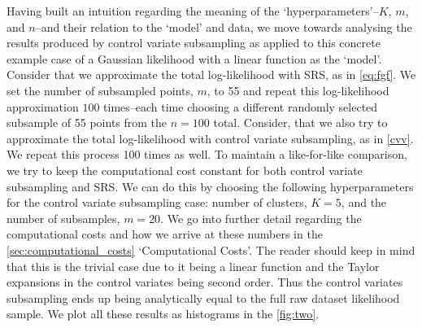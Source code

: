 Having built an intuition regarding the meaning of the `hyperparameters'--$K$, $m$, and $n$--and their relation to the `model' and data, we move towards analysing the results produced by control variate subsampling as applied to this concrete example case of a Gaussian likelihood with a linear function as the `model'. Consider that we approximate the total log-likelihood with SRS, as in \cref{eq:fgf}. We set the number of subsampled points, $m$, to 55 and repeat this log-likelihood approximation $100$ times--each time choosing a different randomly selected subsample of 55 points from the $n=100$ total. Consider, that we also try to approximate the total log-likelihood with control variate subsampling, as in \cref{cvv}. We repeat this process 100 times as well. To maintain a like-for-like comparison, we try to keep the computational cost constant for both control variate subsampling and SRS. We can do this by choosing the following hyperparameters for the control variate subsampling case: number of clusters, $K=5$, and the number of subsamples, $m=20$. We go into further detail regarding the computational costs and how we arrive at these numbers in the \cref{sec:computational_costs} `Computational Costs'. The reader should keep in mind that this is the trivial case due to it being a linear function and the Taylor expansions in the control variates being second order. Thus the control variates subsampling ends up being analytically equal to the full raw dataset likelihood sample. We plot all these results as histograms in the \cref{fig:two}.


